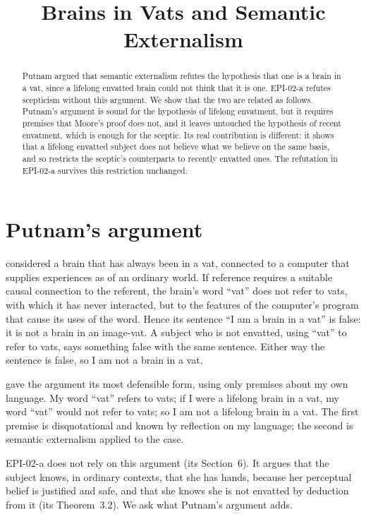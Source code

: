 \documentclass{situationist-preprint}
\title{Brains in Vats and Semantic Externalism}
\begin{document}
\maketitle

\begin{abstract}
Putnam argued that semantic externalism refutes the hypothesis that one is a brain in a vat, since a lifelong envatted brain could not think that it is one. EPI-02-a refutes scepticism without this argument. We show that the two are related as follows. Putnam's argument is sound for the hypothesis of lifelong envatment, but it requires premises that Moore's proof does not, and it leaves untouched the hypothesis of recent envatment, which is enough for the sceptic. Its real contribution is different: it shows that a lifelong envatted subject does not believe what we believe on the same basis, and so restricts the sceptic's counterparts to recently envatted ones. The refutation in EPI-02-a survives this restriction unchanged.
\end{abstract}

\section{Putnam's argument}

\citet[ch.~1]{Putnam1981} considered a brain that has always been in a vat, connected to a computer that supplies experiences as of an ordinary world. If reference requires a suitable causal connection to the referent, the brain's word \enquote{vat} does not refer to vats, with which it has never interacted, but to the features of the computer's program that cause its uses of the word. Hence its sentence \enquote{I am a brain in a vat} is false: it is not a brain in an image-vat. A subject who is not envatted, using \enquote{vat} to refer to vats, says something false with the same sentence. Either way the sentence is false, so I am not a brain in a vat.

\citet{Brueckner1986} gave the argument its most defensible form, using only premises about my own language. My word \enquote{vat} refers to vats; if I were a lifelong brain in a vat, my word \enquote{vat} would not refer to vats; so I am not a lifelong brain in a vat. The first premise is disquotational and known by reflection on my language; the second is semantic externalism applied to the case.

EPI-02-a does not rely on this argument (its Section~6). It argues that the subject knows, in ordinary contexts, that she has hands, because her perceptual belief is justified and safe, and that she knows she is not envatted by deduction from it (its Theorem~3.2). We ask what Putnam's argument adds.
\end{document}
